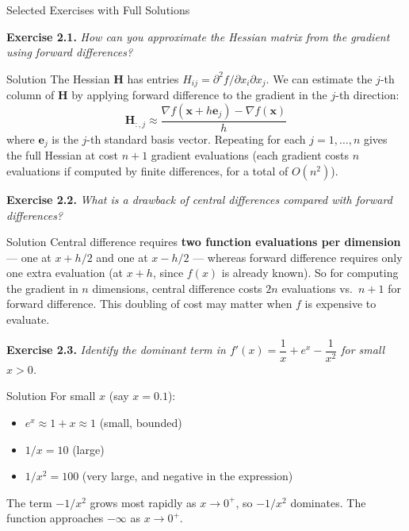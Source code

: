 \documentclass[aspectratio=169,10pt]{beamer}
\newcommand{\x}{\mathbf{x}}
\begin{document}
\begin{frame}[allowframebreaks]{Selected Exercises with Full Solutions}

  \textbf{Exercise 2.1.}
  \emph{How can you approximate the Hessian matrix from the gradient using
  forward differences?}

  \begin{block}{Solution}
    The Hessian $\mathbf{H}$ has entries
    $H_{ij} = \partial^2 f / \partial x_i \partial x_j$.
    We can estimate the $j$-th column of $\mathbf{H}$ by applying
    forward difference to the gradient in the $j$-th direction:
    \[
      \mathbf{H}_{:,j}
      \approx
      \frac{\nabla f(\x + h\mathbf{e}_j) - \nabla f(\x)}{h}
    \]
    where $\mathbf{e}_j$ is the $j$-th standard basis vector.
    Repeating for each $j = 1, \ldots, n$ gives the full Hessian at
    cost $n+1$ gradient evaluations (each gradient costs $n$ evaluations
    if computed by finite differences, for a total of $O(n^2)$).
  \end{block}

  \medskip
  \textbf{Exercise 2.2.}
  \emph{What is a drawback of central differences compared with forward
  differences?}

  \begin{block}{Solution}
    Central difference requires \textbf{two function evaluations per
    dimension} --- one at $x + h/2$ and one at $x - h/2$ --- whereas
    forward difference requires only one extra evaluation (at $x+h$,
    since $f(x)$ is already known).  So for computing the gradient in $n$
    dimensions, central difference costs $2n$ evaluations vs.\ $n+1$ for
    forward difference.  This doubling of cost may matter when $f$ is
    expensive to evaluate.
  \end{block}

  \framebreak

  \textbf{Exercise 2.3.}
  \emph{Identify the dominant term in
  $f'(x) = \dfrac{1}{x} + e^x - \dfrac{1}{x^2}$ for small $x > 0$.}

  \begin{block}{Solution}
    For small $x$ (say $x = 0.1$):
    \begin{itemize}
      \item $e^x \approx 1 + x \approx 1$ (small, bounded)
      \item $1/x = 10$ (large)
      \item $1/x^2 = 100$ (very large, and negative in the expression)
    \end{itemize}
    The term $-1/x^2$ grows most rapidly as $x\to 0^+$, so
    $-1/x^2$ dominates.  The function approaches $-\infty$ as
    $x\to 0^+$.
  \end{block}


\end{frame}
\end{document}
